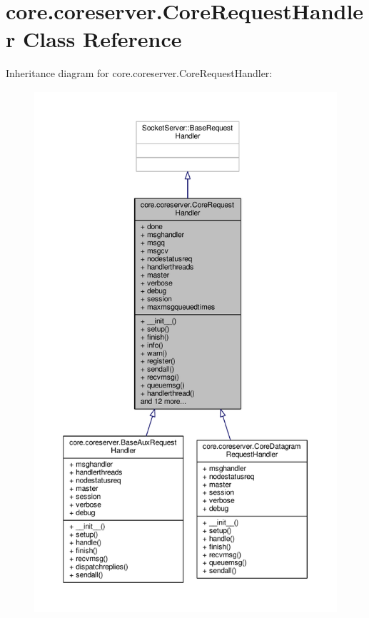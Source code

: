 \hypertarget{classcore_1_1coreserver_1_1_core_request_handler}{\section{core.\+coreserver.\+Core\+Request\+Handler Class Reference}
\label{classcore_1_1coreserver_1_1_core_request_handler}
}


Inheritance diagram for core.\+coreserver.\+Core\+Request\+Handler\+:
\nopagebreak
\begin{figure}[H]
\begin{center}
\leavevmode
\includegraphics[height=550pt]{classcore_1_1coreserver_1_1_core_request_handler__inherit__graph}
\end{center}
\end{figure}


